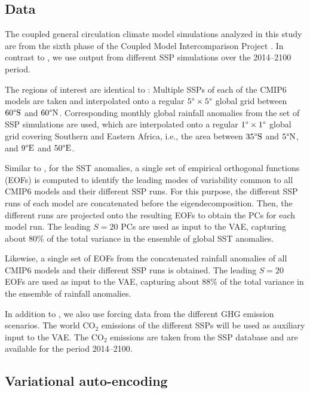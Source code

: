 \documentclass[english,a4paper,10pt]{scrartcl}
\newcommand{\degr}[1]{\text{\textdegree #1}}
\begin{document}
\subsection{Data}\label{sec:data}

The coupled general circulation climate model simulations analyzed in this study are from the sixth phase of the Coupled Model Intercomparison Project \citep[CMIP6,][]{Flynn.Mauritsen.2020}. In contrast to \cite{Groth.precip-predict.2023}, we use output from different SSP simulations over the 2014--2100 period.

The regions of interest are identical to \cite{Groth.precip-predict.2023}: Multiple SSPs of each of the CMIP6 models are taken and interpolated onto a regular $5\degr{}\times5\degr{}$ global grid between $60\degr{S}$ and $60\degr{N}$. Corresponding monthly global rainfall anomalies from the set of SSP simulations are used, which are interpolated onto a regular $1\degr{}\times1\degr{}$ global grid covering Southern and Eastern Africa, i.e., the area between $35\degr{S}$ and $5\degr{N}$, and $9\degr{E}$ and $50\degr{E}$.

Similar to \cite{Groth.precip-predict.2023}, for the SST anomalies, a single set of empirical orthogonal functions (EOFs) is computed to identify the leading modes of variability common to all CMIP6 models and their different SSP runs. For this purpose, the different SSP runs of each model are concatenated before the eigendecomposition. Then, the different runs are projected onto the resulting EOFs to obtain the PCs for each model run. The leading $S=20$ PCs are used as input to the VAE, capturing about 80\% of the total variance in the ensemble of global SST anomalies.

Likewise, a single set of EOFs from the concatenated rainfall anomalies of all CMIP6 models and their different SSP runs is obtained. The leading $S=20$ EOFs are used as input to the VAE, capturing about 88\% of the total variance in the ensemble of rainfall anomalies.

In addition to \cite{Groth.precip-predict.2023}, we also use forcing data from the different GHG emission scenarios. The world CO$_2$ emissions of the different SSPs will be used as auxiliary input to the VAE. The CO$_2$ emissions are taken from the SSP database and are available for the period 2014--2100.

\subsection{Variational auto-encoding}
\end{document}
